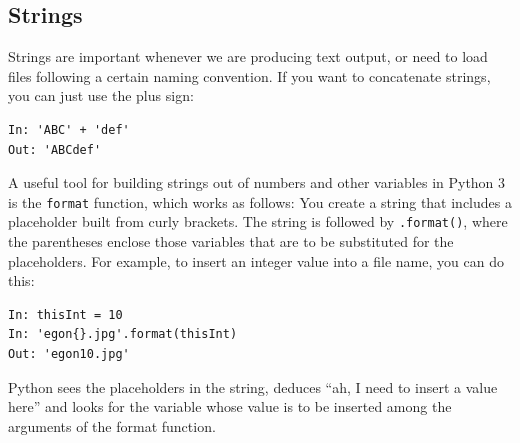 \documentclass[twocolumn,apj]{openjournal}
\begin{document}
\subsection{Strings}
\label{Strings}

Strings are important whenever we are producing text output, or need to load files following a certain naming convention. If you want to concatenate strings, you can just use the plus sign:
\begin{lstlisting}
In: 'ABC' + 'def'
Out: 'ABCdef'
\end{lstlisting}

A useful tool for building strings out of numbers and other variables in Python 3 is the \verb|format| function, which works as follows: You create a string that includes a placeholder built from curly brackets. The string is followed by \verb|.format()|, where the parentheses enclose those variables that are to be substituted for the placeholders. For example, to insert an integer value into a file name, you can do this:
\begin{lstlisting}
In: thisInt = 10
In: 'egon{}.jpg'.format(thisInt)
Out: 'egon10.jpg'
\end{lstlisting}
Python sees the placeholders in the string, deduces ``ah, I need to insert a value here'' and looks for the variable whose value is to be inserted among the arguments of the format function. 
\end{document}
